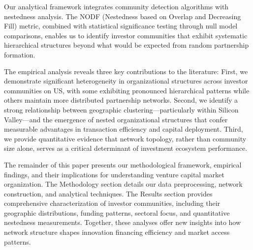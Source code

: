 Our analytical framework integrates community detection algorithms with nestedness analysis. The NODF (Nestedness based on Overlap and Decreasing Fill) metric, combined with statistical significance testing through null model comparisons, enables us to identify investor communities that exhibit systematic hierarchical structures beyond what would be expected from random partnership formation.

The empirical analysis reveals three key contributions to the literature: First, we demonstrate significant heterogeneity in organizational structures across investor communities on US, with some exhibiting pronounced hierarchical patterns while others maintain more distributed partnership networks. Second, we identify a strong relationship between geographic clustering—particularly within Silicon Valley—and the emergence of nested organizational structures that confer measurable advantages in transaction efficiency and capital deployment. Third, we provide quantitative evidence that network topology, rather than community size alone, serves as a critical determinant of investment ecosystem performance.

The remainder of this paper presents our methodological framework, empirical findings, and their implications for understanding venture capital market organization. The Methodology section details our data preprocessing, network construction, and analytical techniques. The Results section provides comprehensive characterization of investor communities, including their geographic distributions, funding patterns, sectoral focus, and quantitative nestedness measurements. Together, these analyses offer new insights into how network structure shapes innovation financing efficiency and market access patterns.